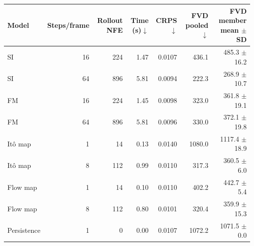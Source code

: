 \begin{tabular}{lrrrrrr}
\toprule
Model & Steps/frame & Rollout NFE & Time (s)$\downarrow$ & CRPS$\downarrow$ & FVD pooled$\downarrow$ & FVD member mean $\pm$ SD \\
\midrule
SI & 16 & 224 & 1.47 & 0.0107 & 436.1 & 485.3 $\pm$ 16.2 \\
SI & 64 & 896 & 5.81 & 0.0094 & 222.3 & 268.9 $\pm$ 10.7 \\
FM & 16 & 224 & 1.45 & 0.0098 & 323.0 & 361.8 $\pm$ 19.1 \\
FM & 64 & 896 & 5.81 & 0.0096 & 330.0 & 372.1 $\pm$ 19.8 \\
It\^o map & 1 & 14 & 0.13 & 0.0140 & 1080.0 & 1117.4 $\pm$ 18.9 \\
It\^o map & 8 & 112 & 0.99 & 0.0110 & 317.3 & 360.5 $\pm$ 6.0 \\
Flow map & 1 & 14 & 0.10 & 0.0110 & 402.2 & 442.7 $\pm$ 5.4 \\
Flow map & 8 & 112 & 0.80 & 0.0101 & 320.4 & 359.9 $\pm$ 15.3 \\
Persistence & 1 & 0 & 0.00 & 0.0107 & 1072.2 & 1071.5 $\pm$ 0.0 \\
\bottomrule
\end{tabular}
